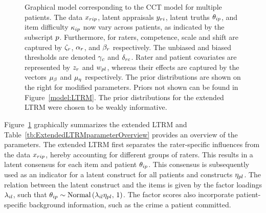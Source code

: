 \documentclass[a4paper,usenames,dvipsnames]{article}
\newenvironment{revision}{\color{teal}}{\color{black}}
\begin{document}
\begin{figure}[!ht]
	\caption{Graphical model corresponding to the CCT model for multiple patients. The data $x_{rip}$, latent appraisals $y_{ri}$, latent truths $\theta_{ip}$, and item difficulty $\kappa_{ip}$ now vary across patients, as indicated by the subscript $p$. Furthermore, for raters, competence, scale and shift are captured by $\zeta_r$, $\alpha_r$, and $\beta_r$ respectively. The unbiased and biased thresholds are denoted $\gamma_c$ and $\delta_{rc}$. Rater and patient covariates are represented by $z_r$ and $w_{pl}$, whereas their effects are captured by the vectors $\mu_{\beta}$ and $\mu_{\eta}$ respectively. The prior distributions are shown on the right for modified parameters. Priors not shown can be found in Figure~\ref{model:LTRM}. The prior distributions for the extended LTRM were chosen to be weakly informative.}
	\label{model:LTRM3}
\end{figure}

Figure~\ref{model:LTRM3} graphically summarizes the extended LTRM \begin{revision}and Table~\ref{tb:ExtendedLTRMparameterOverview} provides an overview of the parameters\end{revision}. The extended LTRM first separates the rater-specific influences from the data $x_{rip}$, hereby accounting for different groups of raters. This results in a latent consensus for each item and patient $\theta_{ip}$. This consensus is subsequently used as an indicator for a latent construct for all patients and constructs $\eta_{pl}$. The relation between the latent construct and the items is given by the factor loadings $\lambda_{il}$, such that $\theta_{ip} \sim \text{Normal}\left(\lambda_{il}\eta_{pl},\,1\right)$. The factor scores also incorporate patient-specific background information, such as the crime a patient committed.
\end{document}
